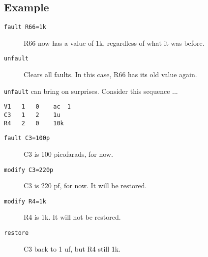 \subsection{Example}

\begin{description}

\item[{\tt fault R66=1k}] R66 now has a value of 1k, regardless of what it
was before.

\item[{\tt unfault}] Clears all faults.  In this case, R66 has its old value
again.

\end{description}

{\tt unfault} can bring on surprises.  Consider this sequence ...

\begin{verbatim}
V1   1   0    ac  1
C3   1   2    1u
R4   2   0    10k
\end{verbatim}

\begin{description}

\item[{\tt fault C3=100p}] C3 is 100 picofarads, for now.

\item[{\tt modify C3=220p}] C3 is 220 pf, for now.  It will be restored.

\item[{\tt modify R4=1k}] R4 is 1k.  It will not be restored.

\item[{\tt restore}] C3 back to 1 uf, but R4 still 1k.

\end{description}
